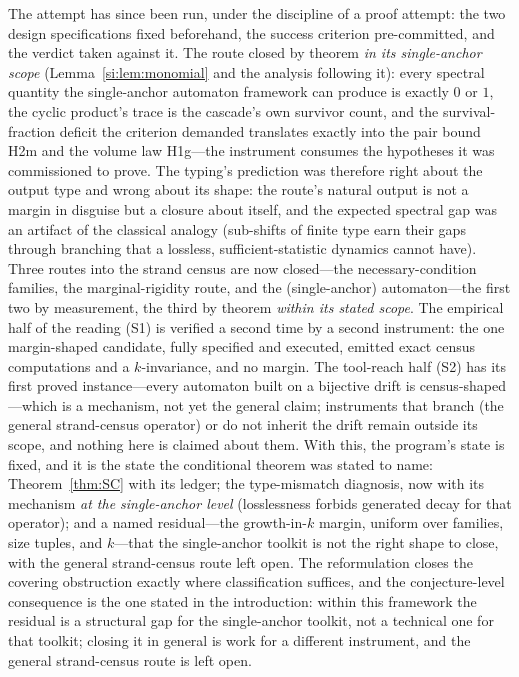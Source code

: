 The attempt has since been run, under the discipline of a proof
attempt: the two design specifications fixed beforehand, the success
criterion pre-committed, and the verdict taken against it. The route
closed by theorem \emph{in its single-anchor scope}
(Lemma~\ref{si:lem:monomial} and the analysis following it): every spectral
quantity the single-anchor automaton framework can produce is
exactly $0$ or $1$, the cyclic product's trace is the cascade's own
survivor count, and the survival-fraction deficit the criterion
demanded translates exactly into the pair bound H2m and the volume law
H1g---the instrument consumes the hypotheses it was commissioned to
prove. The typing's prediction was therefore right about the output
type and wrong about its shape: the route's natural output is not a
margin in disguise but a closure about itself, and the expected
spectral gap was an artifact of the classical analogy (sub-shifts of
finite type earn their gaps through branching that a lossless,
sufficient-statistic dynamics cannot have). Three routes into the
strand census are now closed---the necessary-condition families, the
marginal-rigidity route, and the (single-anchor) automaton---the first
two by measurement, the third by theorem \emph{within its stated
scope}. The empirical half of the reading (S1) is verified a second
time by a second instrument: the one margin-shaped candidate, fully
specified and executed, emitted exact census computations and a
$k$-invariance, and no margin. The tool-reach half (S2) has its first
proved instance---every automaton built on a bijective drift is
census-shaped---which is a mechanism, not yet the general claim;
instruments that branch (the general strand-census operator) or do not
inherit the drift remain outside its scope, and nothing here is claimed
about them. With this, the program's state is fixed, and it is the
state the conditional theorem was stated to name: Theorem~\ref{thm:SC}
with its ledger; the type-mismatch diagnosis, now with its mechanism
\emph{at the single-anchor level} (losslessness forbids generated decay
for that operator); and a named residual---the growth-in-$k$ margin,
uniform over families, size tuples, and $k$---that the single-anchor
toolkit is not the right shape to close, with the general strand-census
route left open. The reformulation closes the covering obstruction exactly
where classification suffices, and the conjecture-level consequence is
the one stated in the introduction: within this framework the residual
is a structural gap for the single-anchor toolkit, not a technical one
for that toolkit; closing it in general is work for a different
instrument, and the general strand-census route is left open.

